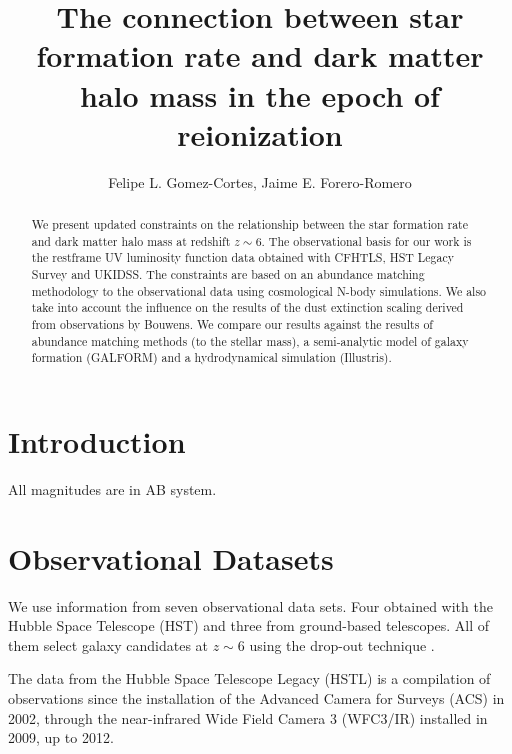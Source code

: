 \documentclass{emulateapj}
\begin{document}
\title{The connection between star formation rate and dark matter halo
  mass in the epoch of reionization}  


\author{Felipe L. Gomez-Cortes, Jaime E. Forero-Romero}  

\begin{abstract}
We present updated constraints on the relationship between the star
formation rate and dark matter halo mass at redshift $z\sim 6$.
The observational basis for our work is the restframe UV luminosity
function data obtained with CFHTLS, HST Legacy Survey and UKIDSS.
The constraints are based on an abundance matching methodology to the
observational data using cosmological N-body simulations.
We also take into account the influence on the results of the dust extinction
scaling derived from observations by Bouwens.
We compare our results against the results of abundance matching
methods (to the stellar mass), a semi-analytic model of galaxy
formation (GALFORM) and a hydrodynamical simulation (Illustris).
\end{abstract}


\section{Introduction}
\label{sec:intro}



All magnitudes are in AB system.
\section{Observational Datasets}
\label{sec:theo}


We use information from seven observational data sets.
Four obtained with the Hubble Space Telescope (HST) and three from
ground-based telescopes.
All of them select galaxy candidates at $z\sim 6$ using the drop-out
technique \citep{Steidel96}.  

The data from the Hubble Space Telescope Legacy (HSTL)
\citep{Bouwens15} is a compilation   of observations since the
installation of the Advanced Camera for Surveys (ACS) in 2002,
through the near-infrared Wide Field Camera 3 (WFC3/IR) installed in
2009, up to 2012.  
\end{document}

